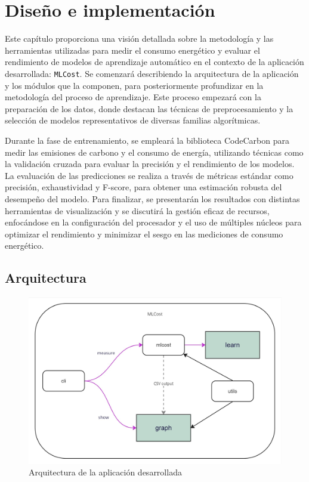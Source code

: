 \chapter{Diseño e implementación}
\label{chap:diseño}

Este capítulo proporciona una visión detallada sobre la metodología y las herramientas utilizadas para medir el consumo energético y evaluar el rendimiento de modelos de aprendizaje automático en el contexto de la aplicación desarrollada: \texttt{MLCost}. Se comenzará describiendo la arquitectura de la aplicación y los módulos que la componen, para posteriormente profundizar en la metodología del proceso de aprendizaje. Este proceso empezará con la preparación de los datos, donde destacan las técnicas de preprocesamiento y la selección de modelos representativos de diversas familias algorítmicas. 

Durante la fase de entrenamiento, se empleará la biblioteca CodeCarbon para medir las emisiones de carbono y el consumo de energía, utilizando técnicas como la validación cruzada para evaluar la precisión y el rendimiento de los modelos. La evaluación de las predicciones se realiza a través de métricas estándar como precisión, exhaustividad y F-score, para obtener una estimación robusta del desempeño del modelo. Para finalizar, se presentarán los resultados con distintas herramientas de visualización y se discutirá la gestión eficaz de recursos, enfocándose en la configuración del procesador y el uso de múltiples núcleos para optimizar el rendimiento y minimizar el sesgo en las mediciones de consumo energético.


\section{Arquitectura}

\begin{figure}[H]
  \centerline{
     \includegraphics[width=\textwidth, keepaspectratio]{img/general-arch.jpg}
  }
  \caption{Arquitectura de la aplicación desarrollada}
  \label{fig:app-arch}
\end{figure}

